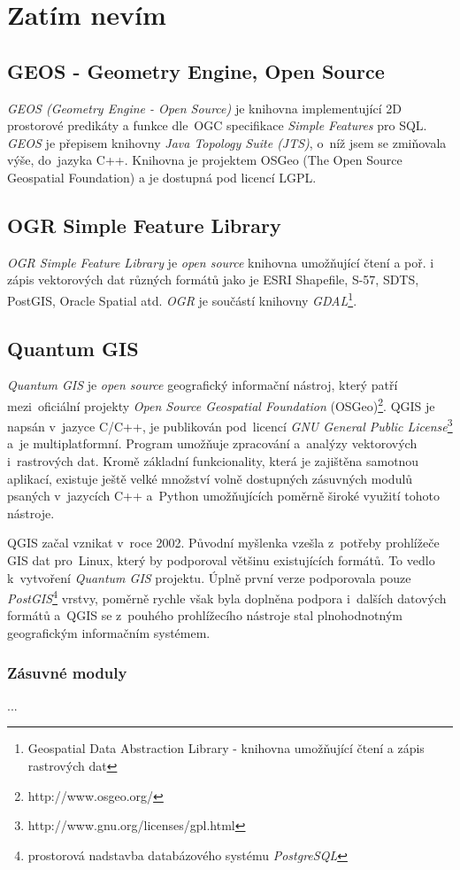 \chapter{Zatím nevím}
\label{4-nevim}

\section{GEOS - Geometry Engine, Open Source}
\label{geos}

\textit{GEOS (Geometry Engine - Open Source)} je knihovna implementující 2D prostorové predikáty a funkce dle~OGC specifikace \textit{Simple Features} pro SQL. \textit{GEOS}
je přepisem knihovny \textit{Java Topology Suite (JTS)}, o~níž jsem se zmiňovala výše, do~jazyka C++. Knihovna je projektem OSGeo (The Open Source Geospatial Foundation) a je
dostupná pod licencí LGPL.

\section{OGR Simple Feature Library}
\label{ogr}

\textit{OGR Simple Feature Library} je \textit{open source} knihovna umožňující čtení a poř. i zápis vektorových dat různých formátů jako je ESRI Shapefile, S-57, SDTS, 
PostGIS, Oracle Spatial atd. \textit{OGR} je součástí knihovny \textit{GDAL}\footnote{Geospatial Data Abstraction Library - knihovna umožňující čtení a zápis rastrových dat}.

\section{Quantum GIS}
\label{qgis}

\textit{Quantum GIS} je \textit{open source} geografický informační nástroj, který patří mezi~oficiální projekty \textit{Open Source Geospatial Foundation} 
(OSGeo)\footnote{http://www.osgeo.org/}. QGIS je napsán v~jazyce C/C++, je publikován pod~licencí \textit{GNU General Public License}\footnote{http://www.gnu.org/licenses/gpl.html}
a~je multiplatformní. Program umožňuje zpracování a~analýzy vektorových i~rastrových dat. Kromě základní funkcionality, která je zajištěna samotnou aplikací, existuje ještě 
velké množství volně dostupných zásuvných modulů psaných v~jazycích C++ a~Python umožňujících poměrně široké využití tohoto nástroje.

QGIS začal vznikat v~roce 2002. Původní myšlenka vzešla z~potřeby prohlížeče GIS dat pro~Linux, který by podporoval většinu existujících formátů. To vedlo k~vytvoření 
\textit{Quantum GIS} projektu. Úplně první verze podporovala pouze \textit{PostGIS}\footnote{prostorová nadstavba databázového systému \textit{PostgreSQL}} vrstvy, poměrně 
rychle však byla doplněna podpora i~dalších datových formátů a~QGIS se z~pouhého prohlížecího nástroje stal plnohodnotným geografickým informačním systémem.


\subsection{Zásuvné moduly}
\label{qgis plugins}
...